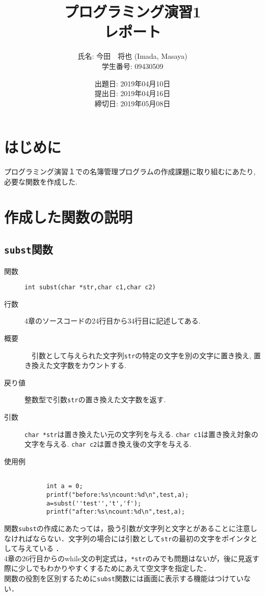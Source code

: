 \documentclass[a4j,11pt]{jarticle}
\title{プログラミング演習1 \\
       レポート}
\author{氏名: 今田　将也 (Imada, Masaya) \\
        学生番号: 09430509}
\date{出題日: 2019年04月10日 \\
      提出日: 2019年04月16日 \\
      締切日: 2019年05月08日 \\}  %
\begin{document}
\maketitle

\section{はじめに}
プログラミング演習１での名簿管理プログラムの作成課題に取り組むにあたり, 必要な関数を作成した. 

\section{作成した関数の説明}

\subsection{\texttt{subst}関数}
 \begin{description}
    \item[関数] \verb|int subst(char *str,char c1,char c2)|
    \item[行数]  4章のソースコードの24行目から34行目に記述してある.
    \item[概要]　引数として与えられた文字列\verb|str|の特定の文字を別の文字に置き換え, 置き換えた文字数をカウントする.
    \item[戻り値]整数型で引数\verb|str|の置き換えた文字数を返す.
    \item[引数]  \verb|char *str|は置き換えたい元の文字列を与える. \verb|char c1|は置き換え対象の文字を与える. \verb|char c2|は置き換え後の文字を与える.
    \item[使用例]
      \begin{verbatim}

      int a = 0;
      printf("before:%s\ncount:%d\n",test,a);
      a=subst(''test'','t','f');
      printf("after:%s\ncount:%d\n",test,a);
      \end{verbatim}
	
  \end{description}
関数\verb|subst|の作成にあたっては，扱う引数が文字列と文字とがあることに注意しなければならない．文字列の場合には引数として\verb|str|の最初の文字をポインタとして与えている
．\\4章の26行目からのwhile文の判定式は，\verb|*str|のみでも問題はないが，後に見返す際に少しでもわかりやすくするためにあえて空文字を指定した．\\関数の役割を区別するために\verb|subst|関数には画面に表示する機能はつけていない．
\end{document}
